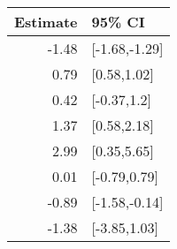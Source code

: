 \begin{tabular}{rl}
  \hline
Estimate & 95\% CI \\ 
  \hline
-1.48 & [-1.68,-1.29] \\ 
  0.79 & [0.58,1.02] \\ 
  0.42 & [-0.37,1.2] \\ 
  1.37 & [0.58,2.18] \\ 
  2.99 & [0.35,5.65] \\ 
  0.01 & [-0.79,0.79] \\ 
  -0.89 & [-1.58,-0.14] \\ 
  -1.38 & [-3.85,1.03] \\ 
   \hline
\end{tabular}

